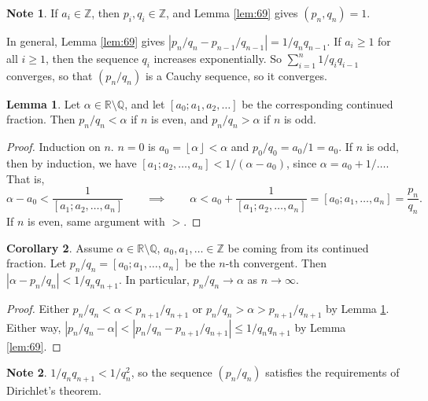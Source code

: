 \documentclass{article}
\newcommand{\Z}{\mathbb{Z}}
\newcommand{\Q}{\mathbb{Q}}
\newcommand{\R}{\mathbb{R}}
\newcommand{\rb}[1]{\left( #1 \right)}
\renewcommand{\sb}[1]{\left[ #1 \right]}
\newcommand{\abs}[1]{\left\lvert #1 \right\rvert}
\newcommand{\fb}[1]{\left\lfloor #1 \right\rfloor}
\theoremstyle{definition}\newtheorem{definition}{Definition}
\theoremstyle{definition}\newtheorem{remark}[definition]{Remark}
\theoremstyle{definition}\newtheorem*{example}{Example}
\theoremstyle{definition}\newtheorem*{note}{Note}
\newtheorem{lemma}[definition]{Lemma}
\newtheorem{corollary}[definition]{Corollary}
\begin{document}
\begin{note}
If $ a_i \in \Z $, then $ p_i, q_i \in \Z $, and Lemma \ref{lem:69} gives $ \rb{p_n, q_n} = 1 $.
\end{note}

In general, Lemma \ref{lem:69} gives $ \abs{p_n / q_n - p_{n - 1} / q_{n - 1}} = 1 / q_nq_{n - 1} $. If $ a_i \ge 1 $ for all $ i \ge 1 $, then the sequence $ q_i $ increases exponentially. So $ \sum_{i = 1}^n 1 / q_iq_{i - 1} $ converges, so that $ \rb{p_n / q_n} $ is a Cauchy sequence, so it converges.


\begin{lemma}
\label{lem:70}
Let $ \alpha \in \R \setminus \Q $, and let $ \sb{a_0; a_1, a_2, \dots} $ be the corresponding continued fraction. Then $ p_n / q_n < \alpha $ if $ n $ is even, and $ p_n / q_n > \alpha $ if $ n $ is odd.
\end{lemma}

\begin{proof}
Induction on $ n $. $ n = 0 $ is $ a_0 = \fb{\alpha} < \alpha $ and $ p_0 / q_0 = a_0 / 1 = a_0 $. If $ n $ is odd, then by induction, we have $ \sb{a_1; a_2, \dots, a_n} < 1 / \rb{\alpha - a_0} $, since $ \alpha = a_0 + 1 / \dots $. That is,
$$ \alpha - a_0 < \dfrac{1}{\sb{a_1; a_2, \dots, a_n}} \qquad \implies \qquad \alpha < a_0 + \dfrac{1}{\sb{a_1; a_2, \dots, a_n}} = \sb{a_0; a_1, \dots, a_n} = \dfrac{p_n}{q_n}. $$
If $ n $ is even, same argument with $ > $.
\end{proof}

\begin{corollary}
Assume $ \alpha \in \R \setminus \Q $, $ a_0, a_1, \dots \in \Z $ be coming from its continued fraction. Let $ p_n / q_n = \sb{a_0; a_1, \dots, a_n} $ be the $ n $-th convergent. Then $ \abs{\alpha - p_n / q_n} < 1 / q_nq_{n + 1} $. In particular, $ p_n / q_n \to \alpha $ as $ n \to \infty $.
\end{corollary}

\begin{proof}
Either $ p_n / q_n < \alpha < p_{n + 1} / q_{n + 1} $ or $ p_n / q_n > \alpha > p_{n + 1} / q_{n + 1} $ by Lemma \ref{lem:70}. Either way, $ \abs{p_n / q_n - \alpha} < \abs{p_n / q_n - p_{n + 1} / q_{n + 1}} \le 1 / q_nq_{n + 1} $ by Lemma \ref{lem:69}.
\end{proof}

\begin{note}
$ 1 / q_nq_{n + 1} < 1 / q_n^2 $, so the sequence $ \rb{p_n / q_n} $ satisfies the requirements of Dirichlet's theorem.
\end{note}
\end{document}

